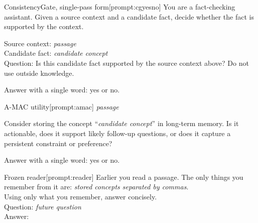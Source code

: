 \begin{sdabox}[prompt]{ConsistencyGate, single-pass form}[prompt:cgyesno]
You are a fact-checking assistant. Given a source context and a
candidate fact, decide whether the fact is supported by the context.

Source context: \emph{passage}\\
Candidate fact: \emph{candidate concept}\\
Question: Is this candidate fact supported by the source context above?
Do not use outside knowledge.

Answer with a single word: yes or no.
\end{sdabox}

\begin{sdabox}[prompt]{A-MAC utility}[prompt:amac]
\emph{passage}

Consider storing the concept ``\emph{candidate concept}'' in long-term
memory. Is it actionable, does it support likely follow-up questions, or
does it capture a persistent constraint or preference?

Answer with a single word: yes or no.
\end{sdabox}

\begin{sdabox}[prompt]{Frozen reader}[prompt:reader]
Earlier you read a passage. The only things you remember from it are:
\emph{stored concepts separated by commas}.\\
Using only what you remember, answer concisely.\\
Question: \emph{future question}\\
Answer:
\end{sdabox}


